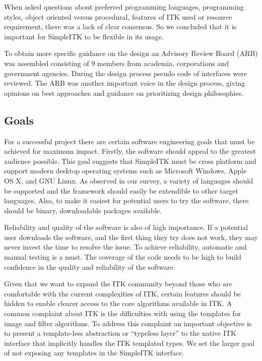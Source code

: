 \documentclass{frontiersMED} %
\begin{document}
When asked questions about preferred programming languages,
programming styles, object oriented versus procedural, features of ITK
used or resource requirement, there was a lack of clear consensus. So
we concluded that it is important for SimpleITK to be flexible in its
usage.

To obtain more specific guidance on the design an Advisory Review
Board (ARB) was assembled consisting of 9 members from academia,
corporations and government agencies. During the design process pseudo
code of interfaces were reviewed. The ARB was another important voice
in the design process, giving opinions on best approaches and guidance
on prioritizing design philosophies.

\subsection{Goals}
For a successful project there are certain software engineering goals
that must be achieved for maximum impact. Firstly, the software should appeal
to the greatest audience possible. This goal suggests that SimpleITK must be
cross platform and support modern desktop operating systems such as
Microsoft Windows, Apple OS X, and GNU Linux. As observed in our
survey, a variety of languages should be supported and the framework
should easily be extendible to other target languages. Also,
to make it easiest for potential users to try the software, there should
be binary, downloadable packages available.

Reliability and quality of the software is also of high importance. If
a potential user downloads the software, and the first thing they try
does not work, they may never invest the time to resolve the issue. To
achieve reliability, automatic and manual testing is a must. The
coverage of the code needs to be high to build confidence in the
quality and reliability of the software.

Given that we want to expand the ITK community beyond those who are
comfortable with the current complexities of ITK, certain features
should be hidden to enable clearer access to the core algorithms
available in ITK. A common complaint about ITK is the
difficulties with using the templates for image and filter algorithms. To address this 
complaint an important objective is to present a template-less abstraction  or
“typeless layer” to the native ITK interface that implicitly handles
the ITK templated types. We set the larger goal of not exposing any
templates in the SimpleITK interface.
\end{document}
